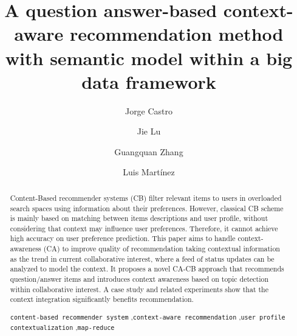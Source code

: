\documentclass[preprint]{elsarticle}
\begin{document}
\title{A question answer-based context-aware recommendation method with semantic model within a big data framework}

\begin{spacing}{1.5}

\begin{frontmatter}

\author[addressjorge,addressjie]{Jorge Castro}

\author[addressjie]{Jie Lu}

\author[addressjie]{Guangquan Zhang}

\author[addressluis]{Luis Mart\'inez}

\address[addressjorge]{Department of Computer Science and Artificial Intelligence, University of Granada, Granada (Spain)}
\address[addressjie]{School of Software, University of Technology Sydney, Sydney (Australia)}
\address[addressluis]{Computer Science Department, University of Ja\'en, Ja\'en (Spain)}

\begin{abstract}

Content-Based recommender systems (CB) filter relevant items to users in overloaded search spaces using information about their preferences. However, classical CB scheme is mainly based on matching between items descriptions and user profile, without considering that context may influence user preferences. Therefore, it cannot achieve high accuracy on user preference prediction. This paper aims to handle context-awareness (CA) to improve quality of recommendation taking contextual information as the trend in current collaborative interest, where a feed of status updates can be analyzed to model the context. It proposes a novel CA-CB approach that recommends question/answer items and introduces context awareness based on topic detection within collaborative interest. A case study and related experiments show that the context integration significantly benefits recommendation.

\begin{keyword}
   \texttt{content-based recommender system} \sep \texttt{context-aware recommendation} \sep \texttt{user profile contextualization} \sep \texttt{map-reduce}
\end{keyword}
\end{abstract}


\end{frontmatter}
\end{spacing}
\end{document}
